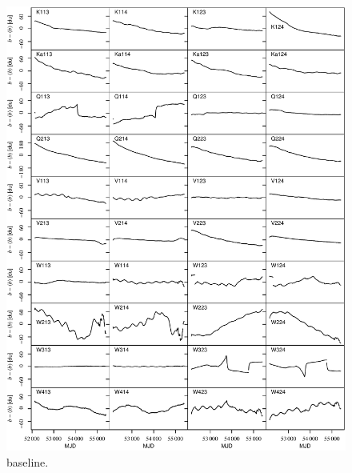 \documentclass[twocolumn]{../../common/aa}
\begin{document}
\begin{figure}[p]
  	\centering
	\includegraphics[width=\textwidth]{figures/instpar_CG_baseline_v1.pdf}
	\caption{baseline.}
	\label{fig:baseline}
\end{figure}
\end{document}
